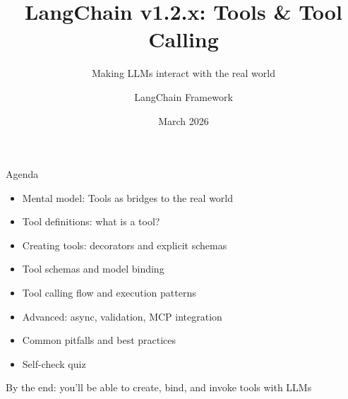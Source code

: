 \documentclass[aspectratio=169,11pt]{beamer}
\title{LangChain v1.2.x: Tools \& Tool Calling}
\subtitle{Making LLMs interact with the real world}
\author{LangChain Framework}
\date{March 2026}
\begin{document}
\frame{\titlepage}

\begin{frame}[fragile]{Agenda}
\begin{itemize}\setlength{\itemsep}{1pt}
  \item Mental model: Tools as bridges to the real world
  \item Tool definitions: what is a tool?
  \item Creating tools: decorators and explicit schemas
  \item Tool schemas and model binding
  \item Tool calling flow and execution patterns
  \item Advanced: async, validation, MCP integration
  \item Common pitfalls and best practices
  \item Self-check quiz
\end{itemize}
\vfill
\textcolor{docgray}{\small By the end: you'll be able to create, bind, and invoke tools with LLMs}
\end{frame}
\end{document}
